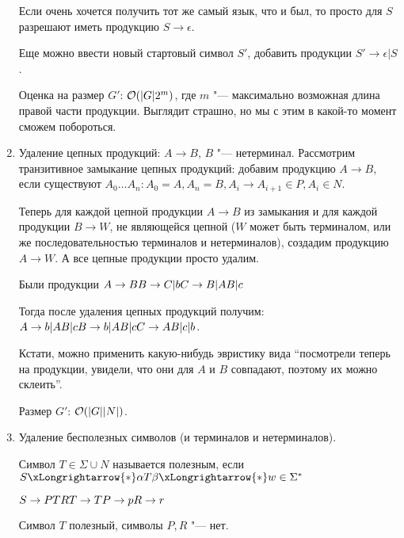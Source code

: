 \begin{enumerate}
\begin{Rem}
Если очень хочется получить тот же самый язык, что и был, то просто для $S$ разрешают иметь продукцию $S \to \epsilon$.

Еще можно ввести новый стартовый символ $S'$, добавить продукции $S' \to \epsilon|S$.
\end{Rem}

Оценка на размер $G'$: $\mathcal{O}(|G| 2^{m})$, где $m$ "--- максимально возможная длина правой части продукции.
Выглядит страшно, но мы с этим в какой-то момент сможем побороться.

\item
Удаление цепных продукций: $A \to B$, $B$ "--- нетерминал.
Рассмотрим транзитивное замыкание цепных продукций: добавим продукцию $A \to B$, если существуют $A_0 \dots A_n\colon A_0 = A, A_n = B, A_i \to A_{i + 1} \in P, A_i \in N$.

Теперь для каждой цепной продукции $A \to B$ из замыкания и для каждой продукции $B \to W$, не являющейся цепной 
($W$ может быть терминалом, или же последовательностью терминалов и нетерминалов), создадим продукцию $A \to W$.
А все цепные продукции просто удалим.

\begin{exmp}
Были продукции $\\
A \to B \\
B \to C | b \\
C \to B | AB | c 
$

Тогда после удаления цепных продукций получим: $\\
A \to b | AB | c \\
B \to b | AB | c \\
C \to AB | c | b
$.

Кстати, можно применить какую-нибудь эвристику вида ``посмотрели теперь на продукции, увидели, что они для $A$ и $B$ совпадают, поэтому их можно склеить''.
\end{exmp}

Размер $G'$: $\mathcal{O}(|G| |N|)$.

\item
Удаление бесполезных символов (и терминалов и нетерминалов).

Символ $T \in \Sigma \cup N$ называется полезным, если $S \xLongrightarrow{*} \alpha T \beta \xLongrightarrow{*} w \in \Sigma^*$

\begin{exmp}
$S \to PTR \\
T \to T
P \to p
R \to r$

Символ $T$ полезный, символы $P, R$ "--- нет.
\end{exmp}


\end{enumerate}
